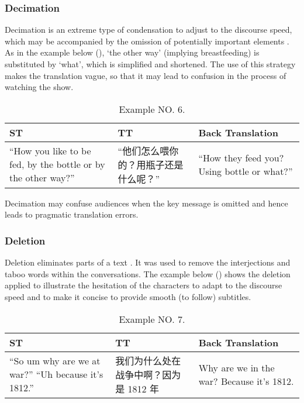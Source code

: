 \documentclass[english]{textolivre}
\begin{document}
\subsubsection{Decimation}

Decimation is an extreme type of condensation to adjust to the discourse speed, which may be accompanied by the omission of potentially important elements \cite{gottlieb_1992}. As in the example below (), `the other way' (implying breastfeeding) is substituted by `what', which is simplified and shortened. The use of this strategy makes the translation vague, so that it may lead to confusion in the process of watching the show. 

\begin{table}[htpb]
\caption{Example NO. 6.}
\label{tbl06}
\begin{tabularx}{\linewidth}{XXX}
\toprule 
ST  & TT & Back Translation \\ 
\midrule
“How you like to be fed, by the bottle or by the other way?”  & “他们怎么喂你的？用瓶子还是什么呢？”  & “How they feed you? Using 
bottle or what?” \\
\bottomrule
\end{tabularx}
\end{table}

Decimation may confuse audiences when the key message is omitted and hence leads to pragmatic translation errors.  

\subsubsection{Deletion}
Deletion eliminates parts of a text \cite{gottlieb_1992}. It was used to remove the interjections and taboo words within the conversations. The example below () shows the deletion applied to illustrate the hesitation of the characters to adapt to the discourse speed and to make it concise to provide smooth (to follow) subtitles.  

\begin{table}[htpb]
\caption{Example NO. 7.}
\label{tbl07}
\begin{tabularx}{\linewidth}{XXX}
\toprule 
ST  & TT & Back Translation \\ 
\midrule
“So um why are we at war?” 
“Uh because it's 1812.”  & 我们为什么处在战争中啊？因为是 1812 年  & Why are we in the war? Because it's 1812. \\
\bottomrule
\end{tabularx}
\end{table}
\end{document}
